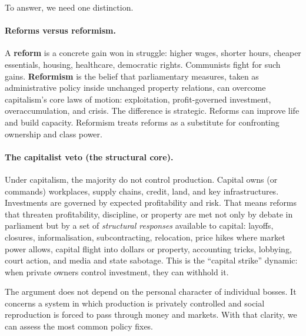 To answer, we need one distinction.

\paragraph{Reforms versus reformism.}
A \textbf{reform} is a concrete gain won in struggle: higher wages, shorter hours, cheaper essentials, housing,
healthcare, democratic rights. Communists fight for such gains. \textbf{Reformism} is the belief that parliamentary
measures, taken as administrative policy inside unchanged property relations, can overcome capitalism's core laws
of motion: exploitation, profit-governed investment, overaccumulation, and crisis. The difference is strategic.
Reforms can improve life and build capacity. Reformism treats reforms as a substitute for confronting ownership
and class power.

\paragraph{The capitalist veto (the structural core).}
Under capitalism, the majority do not control production. Capital owns (or commands) workplaces, supply chains,
credit, land, and key infrastructures. Investments are governed by expected
profitability and risk. That means reforms that threaten profitability, discipline, or property are met not only
by debate in parliament but by a set of \emph{structural responses} available to capital: layoffs, closures,
informalisation, subcontracting, relocation, price hikes where market power allows, capital flight into dollars or
property, accounting tricks, lobbying, court action, and media and state sabotage. This is the ``capital strike''
dynamic: when private owners control investment, they can withhold it.

The argument does not depend on the personal character of individual bosses. It concerns a system in which production is privately
controlled and social reproduction is forced to pass through money and markets. With that clarity, we can assess
the most common policy fixes.

